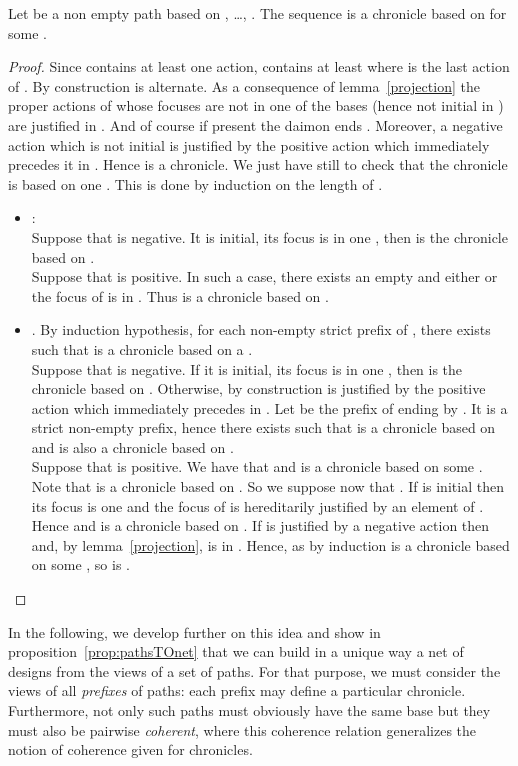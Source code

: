 \documentclass{LMCS}
\begin{document}
\begin{prop}\label{chroniclebase}
Let  be a non empty path based on , \dots,  . The sequence    is a chronicle based on  for some .
\end{prop}

\begin{proof}
Since  contains at least one action,  contains at least  where   is the last action of .
By construction  is alternate.  As a consequence of lemma~\ref{projection} the proper actions of  whose focuses are not in one of the bases (hence not initial in ) are justified in . And of course if present the daimon ends . Moreover, a negative action which is not initial is justified by the positive action which immediately precedes it in . Hence  is a chronicle.
We just have still to check that the chronicle  is based on one . This is done by induction on the length of .
\begin{itemize}
\item :\\
 Suppose that  is negative. It is initial, its focus is in one , then  is the chronicle  based on . 
 \\
 Suppose that  is positive. In such a case, there exists an empty  and either  or the focus of  is in . Thus  is a chronicle based on . 

  \item . By induction hypothesis, for each non-empty strict prefix  of , there exists  such that  is a chronicle based on a .\\
   Suppose that  is negative. If it is initial, its focus is in one ,  then  is the chronicle  based on .  Otherwise, by construction  is justified by the positive action  which immediately precedes  in . Let  be the prefix of  ending by . It is a strict non-empty prefix, hence there exists  such that  is a chronicle based on  and  is also a chronicle based on .\\
Suppose that  is positive. We have that  and  is a chronicle based on some . Note that  is a chronicle based on . So we suppose now that . If  is initial then  its focus  is one  and   the focus of  is hereditarily justified by an element of .  Hence  and   is a chronicle based on   . If  is justified by a negative action   then  and, by lemma~\ref{projection},  is in . Hence, as by induction  is a chronicle based on some , so is .
  \end{itemize}
\end{proof}

\noindent In the following, we develop further on this idea and show in proposition~\ref{prop:pathsTOnet} that we can build in a unique way a net of designs from the views of a set of paths. For that purpose, we must consider the views of all {\em prefixes} of paths: each prefix may define a particular chronicle. Furthermore, not only such paths must obviously have the same base but they must also be pairwise {\em coherent}, where this coherence relation generalizes the notion of coherence given for chronicles.
 
\end{document}
